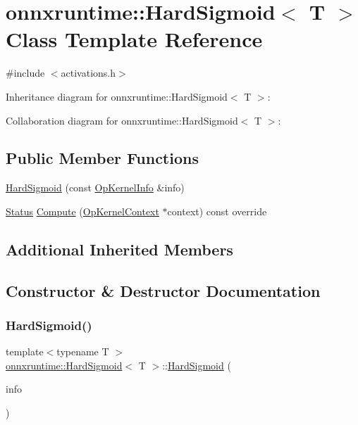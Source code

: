 \hypertarget{classonnxruntime_1_1HardSigmoid}{}\section{onnxruntime\+:\+:Hard\+Sigmoid$<$ T $>$ Class Template Reference}
\label{classonnxruntime_1_1HardSigmoid}


{\ttfamily \#include $<$activations.\+h$>$}



Inheritance diagram for onnxruntime\+:\+:Hard\+Sigmoid$<$ T $>$\+:


Collaboration diagram for onnxruntime\+:\+:Hard\+Sigmoid$<$ T $>$\+:
\subsection*{Public Member Functions}
\begin{DoxyCompactItemize}
\item 
\mbox{\hyperlink{classonnxruntime_1_1HardSigmoid_adacaa2b42d2cd95ab63a547e76636283}{Hard\+Sigmoid}} (const \mbox{\hyperlink{classonnxruntime_1_1OpKernelInfo}{Op\+Kernel\+Info}} \&info)
\item 
\mbox{\hyperlink{classonnxruntime_1_1common_1_1Status}{Status}} \mbox{\hyperlink{classonnxruntime_1_1HardSigmoid_a498e99535c99b871d25dab8879b25b1e}{Compute}} (\mbox{\hyperlink{classonnxruntime_1_1OpKernelContext}{Op\+Kernel\+Context}} $\ast$context) const override
\end{DoxyCompactItemize}
\subsection*{Additional Inherited Members}


\subsection{Constructor \& Destructor Documentation}
\mbox{\label{classonnxruntime_1_1HardSigmoid_adacaa2b42d2cd95ab63a547e76636283}} 
\subsubsection{\texorpdfstring{Hard\+Sigmoid()}{HardSigmoid()}}
{\footnotesize\ttfamily template$<$typename T $>$ \\
\mbox{\hyperlink{classonnxruntime_1_1HardSigmoid}{onnxruntime\+::\+Hard\+Sigmoid}}$<$ T $>$\+::\mbox{\hyperlink{classonnxruntime_1_1HardSigmoid}{Hard\+Sigmoid}} (\begin{DoxyParamCaption}\item[{const \mbox{\hyperlink{classonnxruntime_1_1OpKernelInfo}{Op\+Kernel\+Info}} \&}]{info }\end{DoxyParamCaption})\hspace{0.3cm}{\ttfamily [inline]}}



